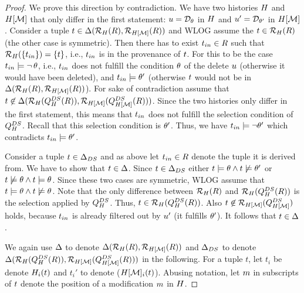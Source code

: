 \begin{proof}
\proofpar{$\dfull \subseteq \dslice$:}
%
  We prove this direction by contradiction. We have two histories $H$ and $H[\mathcal{M}]$ that only differ in the first statement: $u = \mathcal{D}_{\theta}$ in $H$ and $u' = \mathcal{D}_{\theta'}$ in $H[\mathcal{M}]$.
%
  Consider  a tuple $t \in   \Delta(\mathcal{R}_{H}(R),\mathcal{R}_{H[\mathcal{M}]}(R))$ and WLOG assume the $t \in \mathcal{R}_{H}(R)$ (the other case is symmetric). Then there has to exist $t_{in} \in R$ such that $\mathcal{R}_{H}(\{t_{in}\}) = \{ t \}$, i.e., $t_{in}$ is in the provenance of $t$. For this to be the case $t_{in} \models \neg\,\theta$, i.e.,  $t_{in}$ does not fulfill the condition $\theta$ of the delete $u$ (otherwise it would have been deleted), and $t_{in} \models \theta'$ (otherwise $t$ would not be in $\Delta(\mathcal{R}_{H}(R),\mathcal{R}_{H[\mathcal{M}]}(R))$).
  For sake of contradiction assume that $t \not \in \Delta(\mathcal{R}_{H}(Q_{H}^{DS}(R)),\mathcal{R}_{H[\mathcal{M}]}(Q_{H[\mathcal{M}]}^{DS}(R)))$. Since the two histories only differ in the first statement, this means that $t_{in}$ does not fulfill the selection condition of $Q_{H}^{DS}$. Recall that this selection condition is $\theta'$. Thus, we have $t_{in} \models \neg \theta'$ which contradicts $t_{in} \models \theta'$.

\proofpar{$\dfull \supseteq \dslice$:}
%
Consider a tuple $t \in \Delta_{DS}$ and as above let $t_{in} \in R$ denote the tuple it is derived from. We have to show that $t \in \Delta$. Since $t \in \Delta_{DS}$ either $t \models \theta \land t \not\models \theta'$ or $t \not\models \theta \land t \models \theta$. Since these two cases are symmetric, WLOG assume that $t \models \theta \land t \not\models \theta$. Note that the only difference between  $\mathcal{R}_{H}(R)$ and $\mathcal{R}_{H}(Q_{H}^{DS}(R))$ is the selection applied by $Q_{H}^{DS}$. Thus, $t \in \mathcal{R}_{H}(Q_{H}^{DS}(R))$. Also $t \not\in \mathcal{R}_{H[\mathcal{M}]}(Q_{H[\mathcal{M}]}^{DS})$ holds, because $t_{in}$ is already filtered out by $u'$ (it fulfills $\theta'$). It follows that $t \in \Delta$.

We again use $\Delta$ to denote $\Delta(\mathcal{R}_{H}(R),\mathcal{R}_{H[\mathcal{M}]}(R))$ and $\Delta_{DS}$ to denote $\Delta(\mathcal{R}_{H}(Q_{H}^{DS}(R)),\mathcal{R}_{H[\mathcal{M}]}(Q_{H[\mathcal{M}]}^{DS}(R)))$ in the following. For a tuple $t$, let $t_i$ be denote $H_i(t)$ and $t_i'$ to denote ($H[\mathcal{M}]_i(t)$). Abusing notation, let $m$ in subscripts of $t$ denote the position of a modification $m$ in $H$.


\end{proof}
